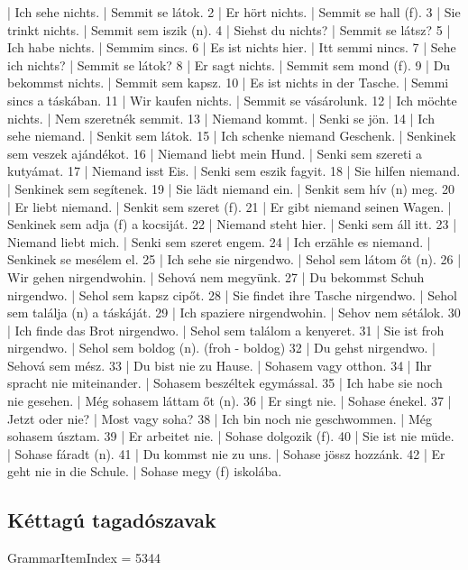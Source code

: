\documentclass{article}
\newenvironment{exmp}{\verbatim}{\endverbatim}
\begin{document}
\begin{exmp}
1 | Ich sehe nichts. | Semmit se látok.
2 | Er hört nichts. | Semmit se hall (f).
3 | Sie trinkt nichts. | Semmit sem iszik (n).
4 | Siehst du nichts? | Semmit se látsz?
5 | Ich habe nichts. | Semmim sincs.
6 | Es ist nichts hier. | Itt semmi nincs.
7 | Sehe ich nichts? | Semmit se látok?
8 | Er sagt nichts. | Semmit sem mond (f).
9 | Du bekommst nichts. | Semmit sem kapsz.
10 | Es ist nichts in der Tasche. | Semmi sincs a táskában.
11 | Wir kaufen nichts. | Semmit se vásárolunk.
12 | Ich möchte nichts. | Nem szeretnék semmit.
13 | Niemand kommt. | Senki se jön.
14 | Ich sehe niemand. | Senkit sem látok.
15 | Ich schenke niemand Geschenk. | Senkinek sem veszek ajándékot.
16 | Niemand liebt mein Hund. | Senki sem szereti a kutyámat.
17 | Niemand isst Eis. | Senki sem eszik fagyit.
18 | Sie hilfen niemand. | Senkinek sem segítenek.
19 | Sie lädt niemand ein. | Senkit sem hív (n) meg.
20 | Er liebt niemand. | Senkit sem szeret (f).
21 | Er gibt niemand seinen Wagen. | Senkinek sem adja (f) a kocsiját.
22 | Niemand steht hier. | Senki sem áll itt.
23 | Niemand liebt mich. | Senki sem szeret engem.
24 | Ich erzähle es niemand. | Senkinek se mesélem el.
25 | Ich sehe sie nirgendwo. | Sehol sem látom őt (n).
26 | Wir gehen nirgendwohin. | Sehová nem megyünk.
27 | Du bekommst Schuh nirgendwo. | Sehol sem kapsz cipőt.
28 | Sie findet ihre Tasche nirgendwo. | Sehol sem találja (n) a táskáját.
29 | Ich spaziere nirgendwohin. | Sehov nem sétálok.
30 | Ich finde das Brot nirgendwo. | Sehol sem találom a kenyeret.
31 | Sie ist froh nirgendwo. | Sehol sem boldog (n). (froh - boldog)
32 | Du gehst nirgendwo. | Sehová sem mész.
33 | Du bist nie zu Hause. | Sohasem vagy otthon.
34 | Ihr spracht nie miteinander. | Sohasem beszéltek egymással.
35 | Ich habe sie noch nie gesehen. | Még sohasem láttam őt (n).
36 | Er singt nie. | Sohase énekel.
37 | Jetzt oder nie? | Most vagy soha?
38 | Ich bin noch nie geschwommen. | Még sohasem úsztam.
39 | Er arbeitet nie. | Sohase dolgozik (f).
40 | Sie ist nie müde. | Sohase fáradt (n).
41 | Du kommst nie zu uns. | Sohase jössz hozzánk.
42 | Er geht nie in die Schule. | Sohase megy (f) iskolába.
\end{exmp}

\subsection{Kéttagú tagadószavak}

GrammarItemIndex = 5344
\end{document}
